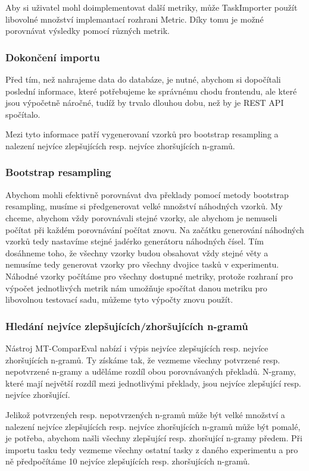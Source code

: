 Aby si uživatel mohl doimplementovat další metriky,
  může TaskImporter použít libovolné množství implemantací rozhrani Metric.
Díky tomu je možné porovnávat výsledky pomocí různých metrik.

\subsubsection{Dokončení importu}
Před tím, než nahrajeme data do databáze, je nutné,
  abychom si dopočítali poslední informace,
  které potřebujeme ke správnému chodu frontendu,
  ale které jsou výpočetně náročné,
  tudíž by trvalo dlouhou dobu,
  než by je REST API spočítalo.

Mezi tyto informace patří vygenerovaní vzorků pro bootstrap resampling a
  nalezení nejvíce zlepšujících resp. nejvíce zhoršujících \mbox{n-gramů}.

\subsubsection{Bootstrap resampling}
Abychom mohli efektivně porovnávat dva překlady pomocí metody bootstrap resampling,
  musíme si předgenerovat velké množství náhodných vzorků.
My chceme,
  abychom vždy porovnávali stejné vzorky,
  ale abychom je nemuseli počítat při každém porovnávání počítat znovu.
Na začátku generování náhodných vzorků tedy nastavíme stejné jadérko generátoru náhodných čísel.
Tím dosáhneme toho,
  že všechny vzorky budou obsahovat vždy stejné věty
  a nemusíme tedy generovat vzorky pro všechny dvojice tasků v experimentu.
Náhodné vzorky počítáme pro všechny dostupné metriky,
  protože rozhraní pro výpočet jednotlivých metrik nám umožňuje spočítat danou metriku pro libovolnou testovací sadu,
  můžeme tyto výpočty znovu použít.


\subsubsection{Hledání nejvíce zlepšujících/zhoršujících \mbox{n-gramů}}
Nástroj MT-ComparEval nabízí i výpis nejvíce zlepšujících resp. nejvíce zhoršujících \mbox{n-gramů}.
Ty získáme tak, že vezmeme všechny potvrzené resp. nepotvrzené \mbox{n-gramy}
  a uděláme rozdíl obou porovnávaných překladů.
N-gramy,
  které mají největší rozdíl mezi jednotlivými překlady,
  jsou nejvíce zlepšující resp. nejvíce zhoršující.

Jelikož potvrzených resp. nepotvrzených \mbox{n-gramů} může být velké množství
  a nalezení nejvíce zlepšujících resp. nejvíce zhoršujících \mbox{n-gramů} může být pomalé,
  je potřeba,
  abychom našli všechny zlepšující resp. zhoršující \mbox{n-gramy} předem.
Při importu tasku tedy vezmeme všechny ostatní tasky z daného experimentu
  a pro ně předpočítáme 10 nejvíce zlepšujících resp. zhoršujících \mbox{n-gramů}. 

